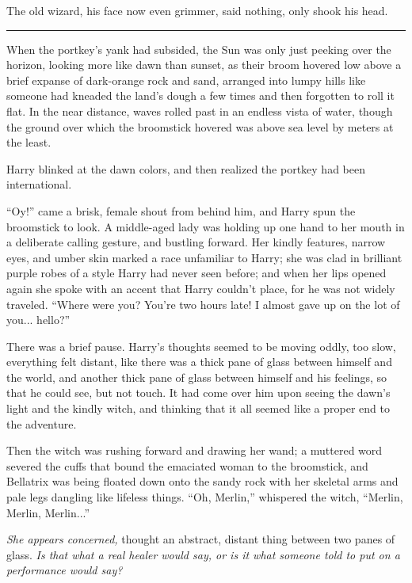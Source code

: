 The old wizard, his face now even grimmer, said nothing, only shook his head.

\begin{center}\rule{3in}{0.4pt}\end{center}

When the portkey's yank had subsided, the Sun was only just peeking over the horizon, looking more like dawn than sunset, as their broom hovered low above a brief expanse of dark-orange rock and sand, arranged into lumpy hills like someone had kneaded the land's dough a few times and then forgotten to roll it flat. In the near distance, waves rolled past in an endless vista of water, though the ground over which the broomstick hovered was above sea level by meters at the least.

Harry blinked at the dawn colors, and then realized the portkey had been international.

``Oy!'' came a brisk, female shout from behind him, and Harry spun the broomstick to look. A middle-aged lady was holding up one hand to her mouth in a deliberate calling gesture, and bustling forward. Her kindly features, narrow eyes, and umber skin marked a race unfamiliar to Harry; she was clad in brilliant purple robes of a style Harry had never seen before; and when her lips opened again she spoke with an accent that Harry couldn't place, for he was not widely traveled. ``Where were you? You're two hours late! I almost gave up on the lot of you... hello?''

There was a brief pause. Harry's thoughts seemed to be moving oddly, too slow, everything felt distant, like there was a thick pane of glass between himself and the world, and another thick pane of glass between himself and his feelings, so that he could see, but not touch. It had come over him upon seeing the dawn's light and the kindly witch, and thinking that it all seemed like a proper end to the adventure.

Then the witch was rushing forward and drawing her wand; a muttered word severed the cuffs that bound the emaciated woman to the broomstick, and Bellatrix was being floated down onto the sandy rock with her skeletal arms and pale legs dangling like lifeless things. ``Oh, Merlin,'' whispered the witch, ``Merlin, Merlin, Merlin...''

\emph{She appears concerned,} thought an abstract, distant thing between two panes of glass. \emph{Is that what a real healer would say, or is it what someone told to put on a performance would say?}

